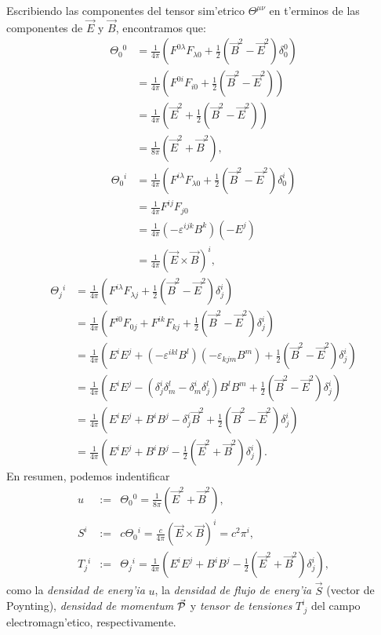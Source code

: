 Escribiendo las componentes del tensor sim'etrico $\Theta^{\mu\nu}$ en t'erminos
de las componentes de $\vec{E}$ y $\vec{B}$, encontramos que:
\begin{align}
\Theta_0{}^0  & =\frac{1}{4\pi}\left(  F^{0\lambda}F_{\lambda0}+\frac
{1}{2}\left(  \vec{B}^2-\vec{E}^2\right)  \delta_0^0\right) \\
& =\frac{1}{4\pi}\left(  F^{0i}F_{i0}+\frac{1}{2}\left(
\vec{B}^2-\vec{E}^2\right)
\right) \\
& =\frac{1}{4\pi}\left(  \vec{E}^2+\frac{1}{2}\left(  \vec{B}^2-\vec{E}^2\right)
 \right) \\
& =\frac{1}{8\pi}\left(  \vec{E}^2+\vec{B}^2\right),
\end{align}%
\begin{align}
\Theta_0{}^i  & =\frac{1}{4\pi}\left(  F^{i\lambda}F_{\lambda0}+\frac
{1}{2}\left(  \vec{B}^2-\vec{E}^2\right)  \delta_0^i\right) \\
& =\frac{1}{4\pi}F^{ij}F_{j0}\\
& =\frac{1}{4\pi}(-\varepsilon^{ijk}B^k)  (-E^j) \\
& =\frac{1}{4\pi}\left(\vec{E}\times\vec{B}\right)^i,
\end{align}%
\begin{align}
\Theta_j{}^i  & =\frac{1}{4\pi}\left(  F^{i\lambda}F_{\lambda j}+\frac
{1}{2}\left( \vec{B}^2-\vec{E}^2\right)  \delta_j^i\right) \\
& =\frac{1}{4\pi}\left(  F^{i0}F_{0j}+F^{ik}F_{kj}+\frac{1}{2}\left(
\vec{B}^2-\vec{E}^2\right)  \delta_j^i\right) \\
& =\frac{1}{4\pi}\left(  E^i E^j +\left(-\varepsilon^{ikl}B^l\right)  \left(
-\varepsilon_{kjm}B^m \right)  +\frac{1}{2}\left(
\vec{B}^2-\vec{E}^2\right)\delta_j^i\right) \\
& =\frac{1}{4\pi}\left(  E^i E^j
-\left(\delta_j^i\delta_{m}^{l}-\delta_{m}^i\delta_j^{l}\right)  B^l B^m
+\frac{1}{2}\left(  \vec{B}^2-\vec{E}^2\right)\delta_j^i\right) \\
& =\frac{1}{4\pi}\left(  E^i E^j+B^i B^j -\delta_j^i\vec{B}^2+\frac{1}{2}\left(
\vec{B}^2-\vec{E}^2\right)  \delta_j^i\right) \\
& =\frac{1}{4\pi}\left(  E^i E^j +B^i B^j -\frac{1}{2}\left(
\vec{E}^2+\vec{B}^2\right)\delta_j^i\right).
\end{align}
En resumen, podemos indentificar
\begin{eqnarray}
u&:=&\Theta_0{}^0=\frac{1}{8\pi}\left( \vec{E}^2+\vec{B}^2\right),\\
S^i&:=&c\Theta_0{}^i=\frac{c}{4\pi}\left(\vec{E}\times\vec{B}\right)^i=c^2\pi^i,\\
T_j{}^i&:=&\Theta_j{}^i=\frac{1}{4\pi}\left(  E^i E^j +B^i B^j
-\frac{1}{2}\left(  \vec{E}^2+\vec{B}^2\right)\delta_j^i\right),
\end{eqnarray}
como la \textit{densidad de energ'ia} $u$, la \textit{densidad de flujo de
energ'ia} $\vec{S}$ (vector de Poynting), \textit{densidad de momentum}
$\vec{\cal P}$ y \textit{tensor de tensiones} $T_{\ j}^i$ del campo
electromagn'etico, respectivamente.

